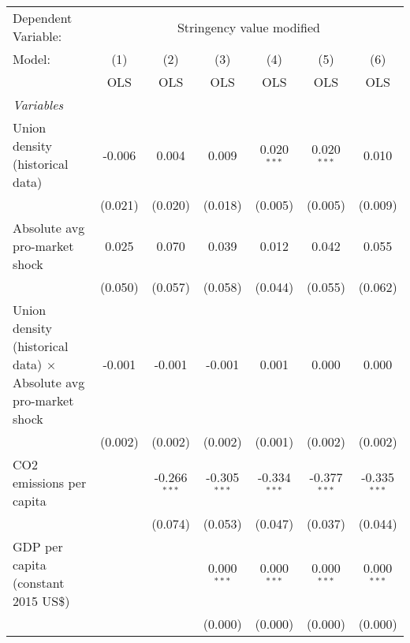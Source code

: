 
\begingroup
\centering
\begin{tabular}{lcccccc}
   \toprule
   Dependent Variable: & \multicolumn{6}{c}{Stringency value modified}\\
   Model:                                                                  & (1)     & (2)            & (3)            & (4)            & (5)            & (6)\\  
                                                                           &  OLS    & OLS            & OLS            & OLS            & OLS            & OLS\\  
   \midrule
   \emph{Variables}\\
   Union density (historical data)                                         & -0.006  & 0.004          & 0.009          & 0.020$^{***}$  & 0.020$^{***}$  & 0.010\\   
                                                                           & (0.021) & (0.020)        & (0.018)        & (0.005)        & (0.005)        & (0.009)\\   
   Absolute avg pro-market shock                                           & 0.025   & 0.070          & 0.039          & 0.012          & 0.042          & 0.055\\   
                                                                           & (0.050) & (0.057)        & (0.058)        & (0.044)        & (0.055)        & (0.062)\\   
   Union density (historical data) $\times$ Absolute avg pro-market shock  & -0.001  & -0.001         & -0.001         & 0.001          & 0.000          & 0.000\\   
                                                                           & (0.002) & (0.002)        & (0.002)        & (0.001)        & (0.002)        & (0.002)\\   
   CO2 emissions per capita                                                &         & -0.266$^{***}$ & -0.305$^{***}$ & -0.334$^{***}$ & -0.377$^{***}$ & -0.335$^{***}$\\   
                                                                           &         & (0.074)        & (0.053)        & (0.047)        & (0.037)        & (0.044)\\   
   GDP per capita (constant 2015 US\$)                                     &         &                & 0.000$^{***}$  & 0.000$^{***}$  & 0.000$^{***}$  & 0.000$^{***}$\\   
                                                                           &         &                & (0.000)        & (0.000)        & (0.000)        & (0.000)\\   

\end{tabular}
